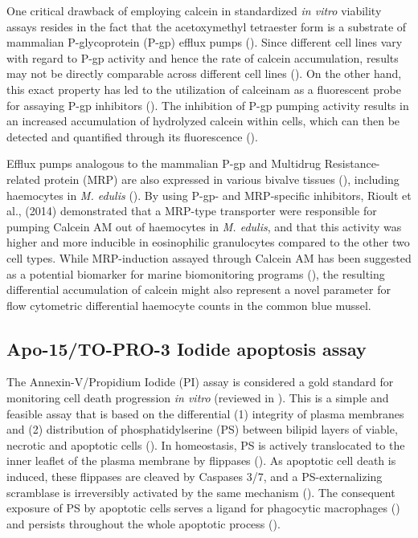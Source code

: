 One critical drawback of employing calcein in standardized \emph{in vitro} viability assays resides in the fact that the acetoxymethyl tetraester form is a substrate of mammalian P-glycoprotein (P-gp) efflux pumps (\cite{Liminga1995}). Since different cell lines vary with regard to P-gp activity and hence the rate of calcein accumulation, results may not be directly comparable across different cell lines (\cite{Ramirez2010}). On the other hand, this exact property has led to the utilization of \acrshort{calceinam} as a fluorescent probe for assaying P-gp inhibitors (\cite{Di2016}). The inhibition of P-gp pumping activity results in an increased accumulation of hydrolyzed calcein within cells, which can then be detected and quantified through its fluorescence (\cite{Tiberghien1996, Köhler2003}).

Efflux pumps analogous to the mammalian P-gp and Multidrug Resistance-related protein (MRP) are also expressed in various bivalve tissues (\cite{Luckenbach2008, Luedeking2005}), including haemocytes in \emph{M. edulis} (\cite{Rioult2014}). By using P-gp- and MRP-specific inhibitors, Rioult et al., (2014) demonstrated that a MRP-type transporter were responsible for pumping Calcein AM out of haemocytes in \emph{M. edulis}, and that this activity was higher and more inducible in eosinophilic granulocytes compared to the other two cell types. While MRP-induction assayed through Calcein AM has been suggested as a potential biomarker for marine biomonitoring programs (\cite{Rioult2014, Minier1998}), the resulting differential accumulation of calcein might also represent a novel parameter for flow cytometric differential haemocyte counts in the common blue mussel.

\subsection{Apo-15/TO-PRO-3 Iodide apoptosis assay}
The Annexin-V/Propidium Iodide (PI) assay is considered a gold standard for monitoring cell death progression \emph{in vitro} (reviewed in \cite{VanEngeland1998}). This is a simple and feasible assay that is based on the differential (1) integrity of plasma membranes and (2) distribution of phosphatidylserine (PS) between bilipid layers of viable, necrotic and apoptotic cells (\cite{Jiang2016}). In homeostasis, PS is actively translocated to the inner leaflet of the plasma membrane by flippases (\cite{Connor1992}). As apoptotic cell death is induced, these flippases are cleaved by Caspases 3/7, and a PS-externalizing scramblase is irreversibly activated by the same mechanism (\cite{Verhoven1995, Suzuki2013}). The consequent exposure of PS by apoptotic cells serves a ligand for phagocytic macrophages (\cite{Fadok1992}) and persists throughout the whole apoptotic process (\cite{Martin1995}).

